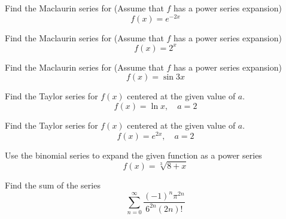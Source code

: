 \documentclass[
  course = {{MATH102 Calculus II}},
  quartile = {{2}},
  assignment = {{Sections 11.10}},%
  topic = {{Taylor and Maclaurin Series}},
  firstexercise = 1,
  term = 203
]{../class/aga-homework}
\begin{document}
\newpage

\problem Find the Maclaurin series for (Assume that $f$ has a power series expansion) $$\displaystyle f(x)=e^{-2x}$$

\newpage

\problem Find the Maclaurin series for (Assume that $f$ has a power series expansion) $$\displaystyle f(x)=2^{x}$$

\newpage

\problem Find the Maclaurin series for (Assume that $f$ has a power series expansion) $$\displaystyle f(x)=\sin 3x $$

\newpage

\problem Find the Taylor series for $f(x)$ centered at the given value of $a$.
$$f(x)=\ln x, \quad a=2$$

\newpage

\problem Find the Taylor series for $f(x)$ centered at the given value of $a$.
$$f(x)=e^{2x}, \quad a=2$$

\newpage

\problem Use the binomial series to expand the given function as a power series
$$ f(x)=\sqrt[3]{8+x}$$

\newpage

\problem Find the sum of the series
$$\sum_{n=0}^{\infty} \frac{(-1)^n\pi^{2n}}{6^{2n}(2n)!}$$
\newpage
\afterpage{\null\newpage}

\afterpage{\null\newpage}

\afterpage{\null\newpage}
\end{document}
